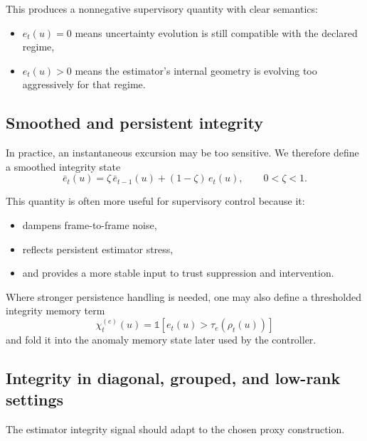 \documentclass[11pt]{article}
\theoremstyle{definition}
\theoremstyle{plain}
\begin{document}
This produces a nonnegative supervisory quantity with clear semantics:
\begin{itemize}[leftmargin=1.5em]
    \item $e_t(u)=0$ means uncertainty evolution is still compatible with the declared regime,
    \item $e_t(u)>0$ means the estimator’s internal geometry is evolving too aggressively for that regime.
\end{itemize}


\subsection{Smoothed and persistent integrity}

In practice, an instantaneous excursion may be too sensitive. We therefore define a smoothed integrity state
\begin{equation}
\bar e_t(u)=\zeta\,\bar e_{t-1}(u)+(1-\zeta)\,e_t(u),
\qquad 0<\zeta<1.
\end{equation}

This quantity is often more useful for supervisory control because it:
\begin{itemize}[leftmargin=1.5em]
    \item dampens frame-to-frame noise,
    \item reflects persistent estimator stress,
    \item and provides a more stable input to trust suppression and intervention.
\end{itemize}

Where stronger persistence handling is needed, one may also define a thresholded integrity memory term
\begin{equation}
\chi^{(e)}_t(u)=\mathbb{1}\!\left[e_t(u)>\tau_e(\rho_t(u))\right]
\end{equation}
and fold it into the anomaly memory state later used by the controller.


\subsection{Integrity in diagonal, grouped, and low-rank settings}

The estimator integrity signal should adapt to the chosen proxy construction.
\end{document}
